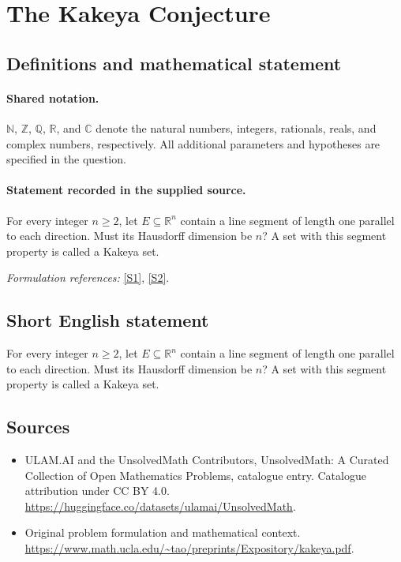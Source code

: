 \documentclass[11pt]{article}
\newcommand{\sref}[2]{\hyperlink{source:#1:#2}{[S#2]}}
\begin{document}
\section{The Kakeya Conjecture}\label{statement}

\subsection{Definitions and mathematical statement}

\paragraph{Shared notation.}$\mathbb N$, $\mathbb Z$, $\mathbb Q$, $\mathbb R$, and $\mathbb C$ denote the natural numbers, integers, rationals, reals, and complex numbers, respectively. All additional parameters and hypotheses are specified in the question.


\paragraph{Statement recorded in the supplied source.}
For every integer $n\geq2$, let $E\subseteq\mathbb R^n$ contain a line segment of length one parallel to each direction. Must its Hausdorff dimension be $n$? A set with this segment property is called a Kakeya set.
\par\smallskip\textit{Formulation references:} \sref{statement}{1}, \sref{statement}{2}.
\subsection{Short English statement}
For every integer $n\geq2$, let $E\subseteq\mathbb R^n$ contain a line segment of length one parallel to each direction. Must its Hausdorff dimension be $n$? A set with this segment property is called a Kakeya set.
\subsection{Sources}
\begin{itemize}
\item[\hypertarget{source:statement:1}{S1}] ULAM.AI and the UnsolvedMath Contributors, UnsolvedMath: A Curated Collection of Open Mathematics Problems, catalogue entry. Catalogue attribution under CC BY 4.0.
\url{https://huggingface.co/datasets/ulamai/UnsolvedMath}.
\item[\hypertarget{source:statement:2}{S2}] Original problem formulation and mathematical context.
\url{https://www.math.ucla.edu/~tao/preprints/Expository/kakeya.pdf}.
\end{itemize}
\label{end:statement}
\end{document}
